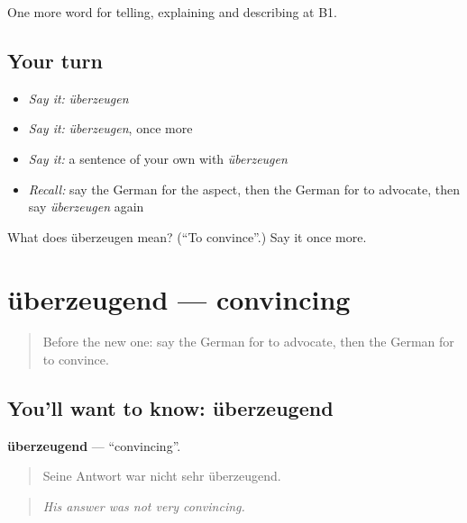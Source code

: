 \begin{grammarlens}[title={What you've built}]
One more word for telling, explaining and describing at B1.
\end{grammarlens}

\subsection*{Your turn}
\begin{itemize}
\raggedright
  \item \emph{Say it:} \emph{überzeugen}
  \item \emph{Say it:} \emph{überzeugen}, once more
  \item \emph{Say it:} a sentence of your own with \emph{überzeugen}
  \item \emph{Recall:} say the German for the aspect, then the German for to advocate, then say \emph{überzeugen} again
\end{itemize}

\begin{tcolorbox}[breakable,colback=teal!4,colframe=teal!35!black,title={Before you move on}]
What does überzeugen mean? (\textquotedblleft{}To convince\textquotedblright{}.) Say it once more.
\end{tcolorbox}
\section[überzeugend]{überzeugend — convincing}

\label{lesson:GE-C331-ueberzeugend}



\begin{quote}
Before the new one: say the German for to advocate, then the German for to convince.
\end{quote}

\subsection*{You'll want to know: überzeugend}
\textbf{überzeugend} — \textquotedblleft{}convincing\textquotedblright{}.

\begin{quote}
Seine Antwort war nicht sehr überzeugend.
\end{quote}

\begin{quote}
\emph{His answer was not very convincing.}
\end{quote}


